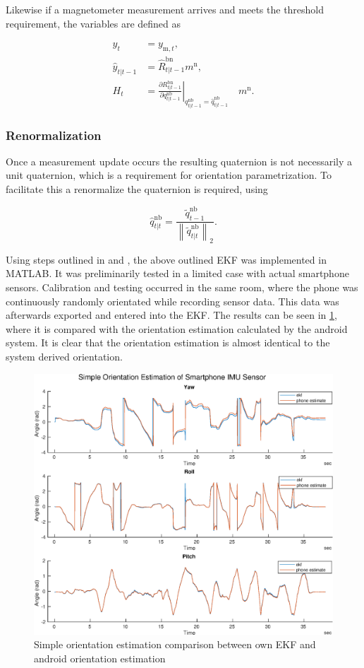 Likewise if a magnetometer measurement arrives and meets the threshold requirement, the variables are defined as

\begin{subequations}
	\begin{align}
	y_{t}&=	y_{\mathrm{m}, t},\\
	\hat{y}_{t | t-1}&=	\hat{R}_{t | t-1}^{\mathrm{bn}} m^{\mathrm{n}},\\
	H_{t}&=	\left.\frac{\partial R_{t | t-1}^{\mathrm{bn}}}{\partial q_{t | t-1}^{\mathrm{nb}}}\right|_{{q_{t | t-1}^{\mathrm{nb}}}=\hat{q}_{t | t-1}^{\mathrm{nb}}} \quad m^{\mathrm{n}}.
	\end{align}
\end{subequations}

\subsubsection{Renormalization}
Once a measurement update occurs the resulting quaternion is not necessarily a unit quaternion, which is a requirement for orientation parametrization. To facilitate this a renormalize the quaternion is required, using

	\begin{equation}
	\hat{q}_{t | t}^{\mathrm{nb}}=\frac{\tilde{q}_{t-1}^{\mathrm{nb}}}{\left\|\tilde{q}_{t | t}^{\mathrm{nb}}\right\|_{2}}.
	\end{equation}

Using steps outlined in \cite{Kok2017} and \cite{Linkoping2013}, the above outlined EKF was implemented in MATLAB. It was preliminarily  tested in a limited case with actual smartphone sensors. Calibration and testing occurred in the same room, where the phone was continuously randomly orientated while recording sensor data. This data was afterwards exported and entered into the EKF. The results can be seen in \cref{fig:simple_stationary_ekf}, where it is compared with the orientation estimation calculated by the android system. It is clear that the orientation estimation is almost identical to the system derived orientation.

\begin{figure}[H]
	\centering
	\includegraphics[width=0.7\linewidth]{images/20201025_2015_simple_stationary_ekf}
	\caption[Simple orientation estimation comparison]{ Simple orientation estimation comparison between own EKF and android orientation estimation}
	\label{fig:simple_stationary_ekf}
\end{figure}

